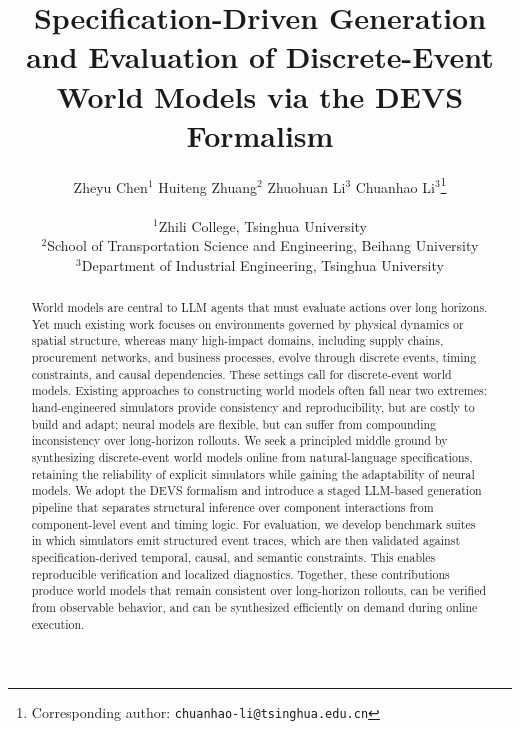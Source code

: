 \documentclass{article}
\title{Specification-Driven Generation and Evaluation of Discrete-Event World Models via the DEVS Formalism}
\author{
Zheyu Chen$^{1}$ \quad
Huiteng Zhuang$^{2}$ \quad
Zhuohuan Li$^{3}$ \quad
Chuanhao Li$^{3}$\thanks{Corresponding author: \texttt{chuanhao-li@tsinghua.edu.cn}} \\
\\
$^{1}$Zhili College, Tsinghua University \\
$^{2}$School of Transportation Science and Engineering, Beihang University \\
$^{3}$Department of Industrial Engineering, Tsinghua University
}
\theoremstyle{plain}
\theoremstyle{definition}
\theoremstyle{remark}
\begin{document}
\maketitle


\begin{abstract}
World models are central to LLM agents that must evaluate actions over long horizons. Yet much existing work focuses on environments governed by physical dynamics or spatial structure, whereas many high-impact domains, including supply chains, procurement networks, and business processes, evolve through discrete events, timing constraints, and causal dependencies. These settings call for discrete-event world models.
Existing approaches to constructing world models often fall near two extremes: hand-engineered simulators provide consistency and reproducibility, but are costly to build and adapt; neural models are flexible, but can suffer from compounding inconsistency over long-horizon rollouts. We seek a principled middle ground by synthesizing discrete-event world models online from natural-language specifications, retaining the reliability of explicit simulators while gaining the adaptability of neural models.
We adopt the DEVS formalism and introduce a staged LLM-based generation pipeline that separates structural inference over component interactions from component-level event and timing logic. For evaluation, we develop benchmark suites in which simulators emit structured event traces, which are then validated against specification-derived temporal, causal, and semantic constraints. This enables reproducible verification and localized diagnostics. Together, these contributions produce world models that remain consistent over long-horizon rollouts, can be verified from observable behavior, and can be synthesized efficiently on demand during online execution.
\end{abstract}













  
  

\newpage
\appendix

\end{document}
